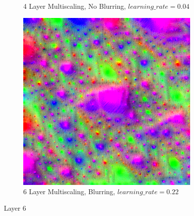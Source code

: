 \begin{figure}
\begin{subfigure}[t]{0.31\textwidth}
        \caption{4 Layer Multiscaling, No Blurring, \(learning\_rate = 0.04\)}
    \end{subfigure}
    \hfill
    \begin{subfigure}[t]{0.31\textwidth}
        \captionsetup{justification=centering}
        \centering
        \includegraphics[width=.7\linewidth]{figuras/feat_vis/experiments/layers/intermediary/l6/random_image_pl6_lr2.2e-1_layer12.png}
        \caption{6 Layer Multiscaling, Blurring, \(learning\_rate = 0.22\)}
    \end{subfigure}
    
    \caption{Layer 6}
    \label{fig:layer_6}
\end{figure}
